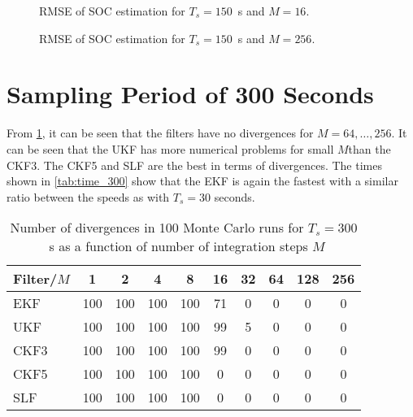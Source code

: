 \documentclass[../zhang_thesis.tex]{subfiles}
\begin{document}
\begin{figure}[h]
\centering
%
\caption{RMSE of SOC estimation for $T_s=150$~s and $M=16$.}
\label{fig:rmse_150_16}
\end{figure}

\begin{figure}
\centering
%
\caption{RMSE of SOC estimation for $T_s=150$~s and $M=256$.}
\label{fig:rmse_150_256}
\end{figure}

\clearpage

\section{Sampling Period of 300 Seconds}

From \cref{tab:div_300}, it can be seen that the filters have no divergences for $M=64,\dots,256$. It can be seen that the UKF has more numerical problems for small $M$than the CKF3. The CKF5 and SLF are the best in terms of divergences. The times shown in \cref{tab:time_300} show that the EKF is again the fastest with a similar ratio between the speeds as with $T_s=30$ seconds. 

\begin{table}[h]
\centering
\caption{Number of divergences in 100 Monte Carlo runs for $T_s=300$~s as a function of number of integration steps $M$}
\begin{tabular}{@{}l*{9}{c}@{}}
\toprule
Filter/$M$ & 1   & 2   & 4   & 8   & 16  & 32 & 64 & 128 & 256 \\
\midrule
EKF        & 100 & 100 & 100 & 100 & 71  & 0  & 0  & 0   & 0   \\
UKF        & 100 & 100 & 100 & 100 & 99  & 5  & 0  & 0   & 0   \\
CKF3       & 100 & 100 & 100 & 100 & 99  & 0  & 0  & 0   & 0   \\
CKF5       & 100 & 100 & 100 & 100 & 0   & 0  & 0  & 0   & 0   \\
SLF        & 100 & 100 & 100 & 100 & 0   & 0  & 0  & 0   & 0   \\
\bottomrule
\end{tabular}
\label{tab:div_300}
\end{table}
\end{document}
